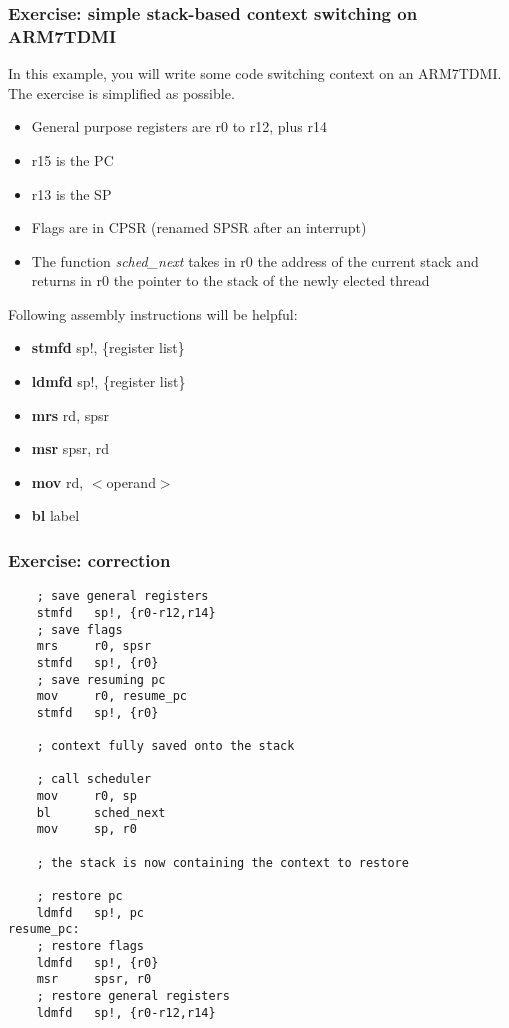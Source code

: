
\begin{frame}
  \frametitle{Exercise: simple stack-based context switching on
  ARM7TDMI}

  In this example, you will write some code switching context on an
  ARM7TDMI. The exercise is simplified as possible.

  \begin{itemize}
  \item
    General purpose registers are r0 to r12, plus r14
  \item
    r15 is the PC
  \item
    r13 is the SP
  \item
    Flags are in CPSR (renamed SPSR after an interrupt)
  \item
    The function \emph{sched\_next} takes in r0 the address of the
    current stack and returns in r0 the pointer to the stack of the
    newly elected thread
  \end{itemize}

  \-

  Following assembly instructions will be helpful:

  \begin{itemize}
  \item
    \textbf{stmfd} sp!, \{register list\}
  \item
    \textbf{ldmfd} sp!, \{register list\}
  \item
    \textbf{mrs} rd, spsr
  \item
    \textbf{msr} spsr, rd
  \item
    \textbf{mov} rd, $<$operand$>$
  \item
    \textbf{bl} label
  \end{itemize}

\end{frame}


\begin{frame}[containsverbatim]
  \frametitle{Exercise: correction}

  \begin{verbatim}
    ; save general registers
    stmfd   sp!, {r0-r12,r14}
    ; save flags
    mrs     r0, spsr
    stmfd   sp!, {r0}
    ; save resuming pc
    mov     r0, resume_pc
    stmfd   sp!, {r0}

    ; context fully saved onto the stack

    ; call scheduler
    mov     r0, sp
    bl      sched_next
    mov	    sp, r0

    ; the stack is now containing the context to restore

    ; restore pc
    ldmfd   sp!, pc
resume_pc:
    ; restore flags
    ldmfd   sp!, {r0}
    msr     spsr, r0
    ; restore general registers
    ldmfd   sp!, {r0-r12,r14}
  \end{verbatim}

\end{frame}

